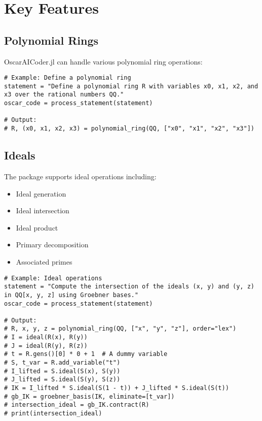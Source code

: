 \documentclass[11pt,a4paper]{article}
\begin{document}
\section{Key Features}

\subsection{Polynomial Rings}

OscarAICoder.jl can handle various polynomial ring operations:

\begin{lstlisting}
# Example: Define a polynomial ring
statement = "Define a polynomial ring R with variables x0, x1, x2, and x3 over the rational numbers QQ."
oscar_code = process_statement(statement)

# Output:
# R, (x0, x1, x2, x3) = polynomial_ring(QQ, ["x0", "x1", "x2", "x3"])
\end{lstlisting}

\subsection{Ideals}

The package supports ideal operations including:

\begin{itemize}
    \item Ideal generation
    \item Ideal intersection
    \item Ideal product
    \item Primary decomposition
    \item Associated primes
\end{itemize}

\begin{lstlisting}
# Example: Ideal operations
statement = "Compute the intersection of the ideals (x, y) and (y, z) in QQ[x, y, z] using Groebner bases."
oscar_code = process_statement(statement)

# Output:
# R, x, y, z = polynomial_ring(QQ, ["x", "y", "z"], order="lex")
# I = ideal(R(x), R(y))
# J = ideal(R(y), R(z))
# t = R.gens()[0] * 0 + 1  # A dummy variable
# S, t_var = R.add_variable("t")
# I_lifted = S.ideal(S(x), S(y))
# J_lifted = S.ideal(S(y), S(z))
# IK = I_lifted * S.ideal(S(1 - t)) + J_lifted * S.ideal(S(t))
# gb_IK = groebner_basis(IK, eliminate=[t_var])
# intersection_ideal = gb_IK.contract(R)
# print(intersection_ideal)
\end{lstlisting}
\end{document}
